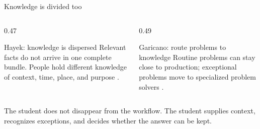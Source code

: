 \begin{frame}{Knowledge is divided too}
  \begin{columns}[T,onlytextwidth]
    \begin{column}{0.47\textwidth}
      \begin{block}{Hayek: knowledge is dispersed}
        Relevant facts do not arrive in one complete bundle. People hold
        different knowledge of context, time, place, and purpose
        \citep{hayek1945knowledge}.
      \end{block}
    \end{column}
    \begin{column}{0.49\textwidth}
      \begin{block}{Garicano: route problems to knowledge}
        Routine problems can stay close to production; exceptional problems
        move to specialized problem solvers \citep{garicano2000hierarchies}.
      \end{block}
    \end{column}
  \end{columns}

  \vspace{0.65em}
  \begin{center}
  \end{center}

  \vfill
  The student does not disappear from the workflow. The student supplies
  context, recognizes exceptions, and decides whether the answer can be kept.
\end{frame}

